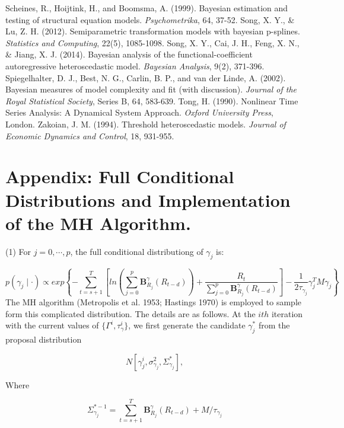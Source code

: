 \documentclass[
journal=jacsat, %
manuscript=article]{achemso}
\begin{document}
\begin{CJK*}{UTF8}{song}
\begin{thebibliography}{99}
 Scheines, R., Hoijtink, H., and Boomsma, A. (1999). Bayesian estimation and testing of structural equation models. {\it Psychometrika}, 64, 37-52.
 Song, X. Y., \& Lu, Z. H. (2012). Semiparametric transformation models with bayesian p-splines. {\it Statistics and Computing}, 22(5), 1085-1098.
 Song, X. Y., Cai, J. H., Feng, X. N., \& Jiang, X. J. (2014). Bayesian analysis of the functional-coefficient autoregressive heteroscedastic model. {\it Bayesian Analysis}, 9(2), 371-396.
 Spiegelhalter, D. J., Best, N. G., Carlin, B. P., and van der Linde, A. (2002). Bayesian measures of model complexity and fit (with discussion). {\it Journal of the Royal Statistical Society}, Series B, 64, 583-639.
 Tong, H. (1990). Nonlinear Time Series Analysis: A Dynamical System Approach. {\it Oxford University Press}, London. 
 Zakoian, J. M. (1994). Threshold heteroscedastic models. {\it Journal of Economic Dynamics and Control}, 18, 931-955.

\end{thebibliography}

\newpage
\section{Appendix: Full Conditional Distributions and Implementation of the MH Algorithm.}

(1) For $j=0,\cdots ,p$, the full conditional distributiong of $\gamma_j$ is:

\begin{equation}
	p(\gamma_j \mid \cdot) \propto exp \left \{ -\sum_{t=s+1}^T\left [ln(\sum_{j=0}^p \bm{B}_{R_j}^{\gamma}(R_{t-d})) + \frac{R_t}{\sum_{j=0}^p \bm{B}_{R_j}^{\gamma}(R_{t-d})}\right ] - \frac{1}{2 \tau_{\gamma_j}} \gamma_j^T M \gamma_j \right \}
\end{equation}
The MH algorithm (Metropolis et al. 1953; Hastings 1970) is employed to sample form this complicated distribution. The details are as follows. At the $ith$ iteration with the current values of $\{\Gamma^i,\tau_{\gamma}^i\}$, we first generate the candidate $\gamma_j^{\ast}$ from the proposal distribution

\begin{equation}
	N\left [ \gamma_j^i,\sigma_{\gamma_j}^2,\Sigma_{\gamma_j}^{\ast} \right ],
\end{equation}

Where 

\begin{equation}
	\Sigma_{\gamma_j}^{\ast - 1}=\sum_{t=s+1}^T \bm{B}_{R_j}^{\gamma}(R_{t-d}) + M/ \tau_{\gamma_j}
\end{equation}


\end{CJK*}
\end{document}
